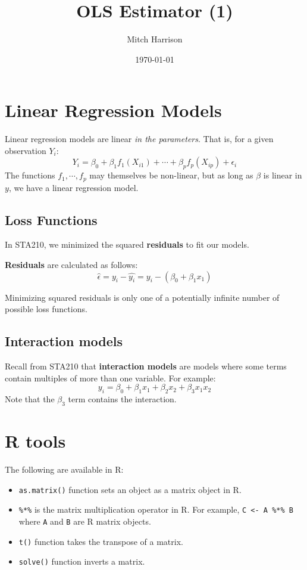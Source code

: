 \documentclass[titlepage, 12pt, leqno]{article}
\title{\Huge{OLS Estimator (1)}}
\author{\large{Mitch Harrison}}
\date{\today}
\begin{document}
\setlength{\parskip}{1\baselineskip}
\setlength{\parindent}{15pt}
\maketitle
\tableofcontents
\newpage


\section{Linear Regression Models}

Linear regression models are linear \textit{in the parameters}. That is, for a 
given observation $Y_i$:
\[
    Y_i = \beta_0 + \beta_1f_1(X_{i1}) + \cdots + \beta_pf_p(X_{ip}) + \epsilon_i
\]
The functions $f_1, \cdots , f_p$ may themselves be non-linear, but as long as
$\beta$ is linear in $y$, we have a linear regression model.

\subsection{Loss Functions}
In STA210, we minimized the squared \textbf{residuals} to fit our models.
\begin{definition}
    \textbf{Residuals} are calculated as follows:
    \[
        \hat \epsilon = y_i - \hat{y_i} = y_i - (\beta_0 + \beta_1x_1)
    \]
\end{definition}
Minimizing squared residuals is only one of a potentially infinite number of 
possible loss functions.

\subsection{Interaction models}
Recall from STA210 that \textbf{interaction models} are models where some terms
contain multiples of more than one variable. For example:
\[
    y_i = \beta_0 + \beta_1x_1 + \beta_2x_2 + \beta_3x_1x_2
\]
Note that the $\beta_3$ term contains the interaction.

\pagebreak
\section{R tools}
The following are available in R:
\begin{itemize}
    \item \texttt{as.matrix()} function sets an object as a matrix object in R.
    \item \texttt{\%*\%} is the matrix multiplication operator in R. For example,
        \texttt{C <- A \%*\% B} where \texttt{A} and \texttt{B} are R matrix
        objects.
    \item \texttt{t()}  function takes the transpose of a matrix.
    \item \texttt{solve()} function inverts a matrix.
\end{itemize}
\end{document}
